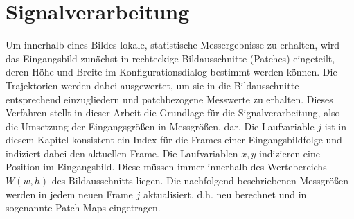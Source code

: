 \section{Signalverarbeitung}
\label{sec:sig}
Um innerhalb eines Bildes lokale, statistische Messergebnisse zu erhalten, wird das Eingangsbild zunächst in rechteckige Bildausschnitte (Patches) eingeteilt, deren Höhe und Breite im Konfigurationsdialog bestimmt werden können. Die Trajektorien werden dabei ausgewertet, um sie in die Bildausschnitte entsprechend einzugliedern und patchbezogene Messwerte zu erhalten. Dieses Verfahren stellt in dieser Arbeit die Grundlage für die Signalverarbeitung, also die Umsetzung der Eingangsgrößen in Messgrößen, dar. Die Laufvariable $j$ ist in diesem Kapitel konsistent ein Index für die Frames einer Eingangsbildfolge und indiziert dabei den aktuellen Frame. Die Laufvariablen $x,y$ indizieren eine Position im Eingangsbild. Diese müssen immer innerhalb des Wertebereichs $W(w,h)$ des Bildausschnitts liegen. Die nachfolgend beschriebenen Messgrößen werden in jedem neuen Frame $j$ aktualisiert, d.h. neu berechnet und in sogenannte Patch Maps eingetragen.

